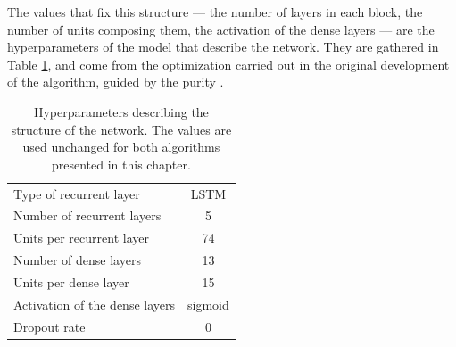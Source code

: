 The values that fix this structure — the number of layers in each block, the number of units composing them, the activation of the dense layers — are the hyperparameters of the model that describe the network. They are gathered in Table \ref{tab:hyperparams}, and come from the optimization carried out in the original development of the algorithm, guided by the purity \textcolor{red}{\cite{CMS-HIG-20-010,HHBTag}}.
%   
\begin{table}[t]
\centering
\begin{tabular}{lc}
\toprule
Type of recurrent layer            & LSTM \\
Number of recurrent layers         & 5 \\
Units per recurrent layer          & 74 \\
Number of dense layers             & 13 \\
Units per dense layer              & 15 \\
Activation of the dense layers     & sigmoid \\
Dropout rate\footnotemark          & 0 \\
\bottomrule
\end{tabular}
\caption{Hyperparameters describing the structure of the network. The values are used unchanged for both algorithms presented in this chapter.}
\label{tab:hyperparams}
\end{table}




